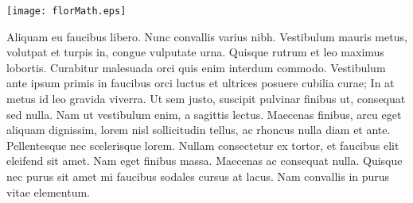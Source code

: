 \documentclass[11pt, a4paper]{article}
\begin{document}
\begin{center}

\texttt{[image: florMath.eps]}
\end{center}


\bigskip
Aliquam eu faucibus libero. Nunc convallis varius nibh. Vestibulum mauris metus, volutpat et turpis in, congue vulputate urna. Quisque rutrum et leo maximus lobortis. Curabitur malesuada orci quis enim interdum commodo. Vestibulum ante ipsum primis in faucibus orci luctus et ultrices posuere cubilia curae; In at metus id leo gravida viverra. Ut sem justo, suscipit pulvinar finibus ut, consequat sed nulla. Nam ut vestibulum enim, a sagittis lectus. Maecenas finibus, arcu eget aliquam dignissim, lorem nisl sollicitudin tellus, ac rhoncus nulla diam et ante. Pellentesque nec scelerisque lorem. Nullam consectetur ex tortor, et faucibus elit eleifend sit amet. Nam eget finibus massa. Maecenas ac consequat nulla. Quisque nec purus sit amet mi faucibus sodales cursus at lacus. Nam convallis in purus vitae elementum.
\end{document}
